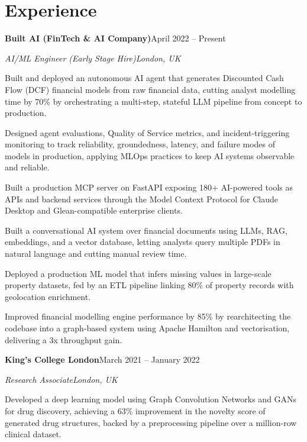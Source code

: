 \documentclass[10pt,a4paper]{article}
\newcommand{\entry}[4]{%
  {\color{company}\bfseries #1}\hfill {\color{muted}#2}\par
  \vspace{1pt}
  {\itshape #3}\hfill {\color{muted}\itshape #4}\par
  \vspace{3pt}%
}
\begin{document}
\section{Experience}
\entry{Built AI (FinTech \& AI Company)}{April 2022 -- Present}{AI/ML Engineer (Early Stage Hire)}{London, UK}
\begin{tight}
  \item Built and deployed an autonomous AI agent that generates Discounted Cash Flow (DCF) financial models from raw financial data, cutting analyst modelling time by 70\% by orchestrating a multi-step, stateful LLM pipeline from concept to production.
  \item Designed agent evaluations, Quality of Service metrics, and incident-triggering monitoring to track reliability, groundedness, latency, and failure modes of models in production, applying MLOps practices to keep AI systems observable and reliable.
  \item Built a production MCP server on FastAPI exposing 180+ AI-powered tools as APIs and backend services through the Model Context Protocol for Claude Desktop and Glean-compatible enterprise clients.
  \item Built a conversational AI system over financial documents using LLMs, RAG, embeddings, and a vector database, letting analysts query multiple PDFs in natural language and cutting manual review time.
  \item Deployed a production ML model that infers missing values in large-scale property datasets, fed by an ETL pipeline linking 80\% of property records with geolocation enrichment.
  \item Improved financial modelling engine performance by 85\% by rearchitecting the codebase into a graph-based system using Apache Hamilton and vectorisation, delivering a 3x throughput gain.
\end{tight}

\entry{King's College London}{March 2021 -- January 2022}{Research Associate}{London, UK}
\begin{tight}
  \item Developed a deep learning model using Graph Convolution Networks and GANs for drug discovery, achieving a 63\% improvement in the novelty score of generated drug structures, backed by a preprocessing pipeline over a million-row clinical dataset.
\end{tight}

\end{document}
